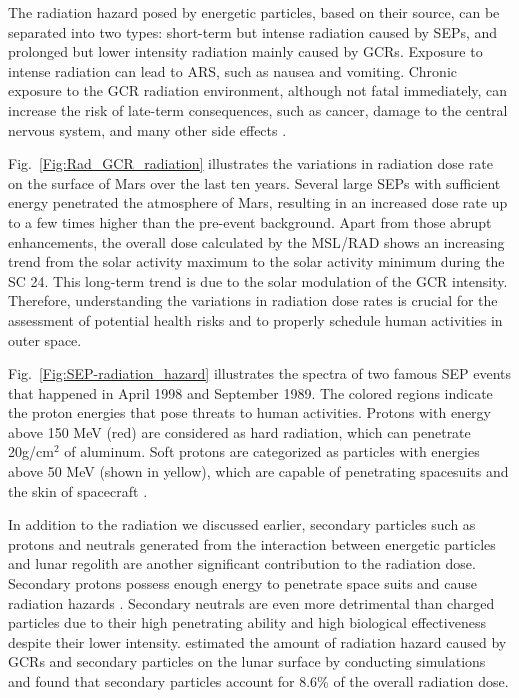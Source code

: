 
The radiation hazard posed by energetic particles, based on their source, can be separated into two types: short-term but intense radiation caused by \acp{SEP}, and prolonged but lower intensity radiation mainly caused by \acp{GCR}.
Exposure to intense radiation can lead to \ac{ARS}, such as nausea and vomiting. Chronic exposure to the \ac{GCR} radiation environment, although not fatal immediately, can increase the risk of late-term consequences, such as cancer, damage to the central nervous system, and many other side effects \citep{Guo2021AARv_rad, cucinotta2006cancer, Kennedy2014LSSR, Iancu2018Frontiers}. 



Fig.~\ref{Fig:Rad_GCR_radiation} illustrates the variations in radiation dose rate on the surface of Mars over the last ten years. Several large \acp{SEP} with sufficient energy penetrated the atmosphere of Mars, resulting in an increased dose rate up to a few times higher than the pre-event background. Apart from those abrupt enhancements, the overall dose calculated by the \ac{MSL}/\ac{RAD} shows an increasing trend from the solar activity maximum to the solar activity minimum during the \ac{SC} 24. This long-term trend is due to the solar modulation of the \ac{GCR} intensity.
Therefore, understanding the variations in radiation dose rates is crucial for the assessment of potential health risks and to properly schedule human activities in outer space. 


Fig.~\ref{Fig:SEP-radiation_hazard} illustrates the spectra of two famous \ac{SEP} events that happened in April 1998 and September 1989. The colored regions indicate the proton energies that pose threats to human activities. Protons with energy above 150 MeV (red) are considered as hard radiation, which can penetrate 20g/cm$^2$ of aluminum. Soft protons are categorized as particles with energies above 50 MeV (shown in yellow), which are capable of penetrating spacesuits and the skin of spacecraft \citep{Reames2021LNP}. 

In addition to the radiation we discussed earlier, secondary particles such as protons and neutrals generated from the interaction between energetic particles and lunar regolith are another significant contribution to the radiation dose. Secondary protons possess enough energy to penetrate space suits and cause radiation hazards \citep{Xu2022FrASS}. Secondary neutrals are even more detrimental than charged particles due to their high penetrating ability and high biological effectiveness despite their lower intensity.
\citet{Spence2013} estimated the amount of radiation hazard caused by \acp{GCR} and secondary particles on the lunar surface by conducting simulations and found that secondary particles account for 8.6\% of the overall radiation dose.

